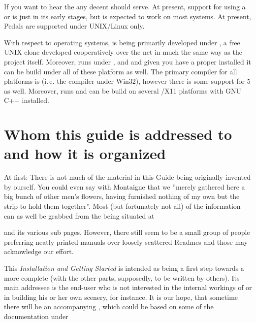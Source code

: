 If you want to hear the  any decent  should serve.
At present, support for using a  or  is just in its early
stages, but is expected to work on most systems. At present, Pedals are supported under
UNIX/Linux only.

With respect to operating systems, \FlightGear is being primarily developed under
, a free UNIX clone developed cooperatively over the net in much the same
way as the \FlightGear project itself. Moreover, \FlightGear runs under ,  and  and given you have a proper
 installed it can be build under all of these platform as well. The
primary compiler for all platforms is  (i.\,e. the  compiler
under Win32), however there is some support for 5 as well. Moreover,
\FlightGear runs and can be build on several /X11 platforms with GNU C++
installed.

\section{Whom this guide is addressed to and how it is organized}

At first: There is not much of the material in this Guide being originally invented by
ourself. You could even say with Montaigne that we ''merely gathered here a big bunch of
other men's flowers, having furnished nothing of my own but the strip to hold them
together''. Most (but fortunately not all) of the information can as well be grabbed from
the  being situated at


 \noindent
 and its various sub pages. However, there still seem to
be a small group of people preferring neatly printed manuals over
loosely scattered Readmes and those may acknowledge our effort.

This \textit{Installation and Getting Started} is intended as being a first step towards
a more complete  (with the other parts, supposedly, to
be written by others). Its main addressee is the end-user who is not interested in the
internal workings of  or in building his or her own scenery, for instance.
It is our hope, that sometime there will be an accompanying \textit{}, which could be based on some of the documentation under

